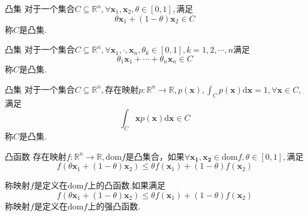 
\begin{definition}{凸集}
对于一个集合$C\subseteq\mathbb{R}^n,\forall\boldsymbol{x}_1,\boldsymbol{x}_2,\theta\in[0,1],$满足
$$\theta\boldsymbol{x}_1+(1-\theta)\boldsymbol{x}_2\in C~$$
称$C$是凸集.
\end{definition}
\begin{definition}{凸集}
对于一个集合$C\subseteq\mathbb{R}^n,\forall\boldsymbol{x}_1,\cdot,\boldsymbol{x}_n,\theta_k\in[0,1],k=1,2,\cdots,n$满足
$$\theta_1\boldsymbol{x}_1+\cdots+\theta_n\boldsymbol{x}_n\in C~$$
称$C$是凸集.
\end{definition}
\begin{definition}{凸集}
对于一个集合$C\subseteq\mathbb{R}^n,$存在映射$p:\mathbb{R}^n\to\mathbb{R},p(\boldsymbol{x}),\int_Cp(\boldsymbol{x})\mathrm{d}\boldsymbol{x}=1,\forall\boldsymbol{x}\in C,$满足
$$\int_C\boldsymbol{x}p(\boldsymbol{x})\mathrm{d}\boldsymbol{x}\in C~$$
称$C$是凸集.
\end{definition}
\begin{definition}{凸函数}
存在映射$f:\mathbb{R}^n\to\mathbb{R},\mathrm{dom} f$是凸集合，如果$\forall\boldsymbol{x_1},\boldsymbol{x_2}\in\mathrm{dom} f, \theta\in[0,1],$满足
$$
f(\theta\boldsymbol{x}_1+(1-\theta)\boldsymbol{x}_2)\leqslant\theta f(\boldsymbol{x}_1) + (1-\theta)f(\boldsymbol{x}_2)~
$$
\end{definition}
称映射$f$是定义在$\mathrm{dom} f$上的凸函数.如果满足
$$
f(\theta\boldsymbol{x}_1+(1-\theta)\boldsymbol{x}_2)\leq\theta f(\boldsymbol{x}_1) + (1-\theta)f(\boldsymbol{x}_2)~
$$
称映射$f$是定义在$\mathrm{dom} f$上的强凸函数.
